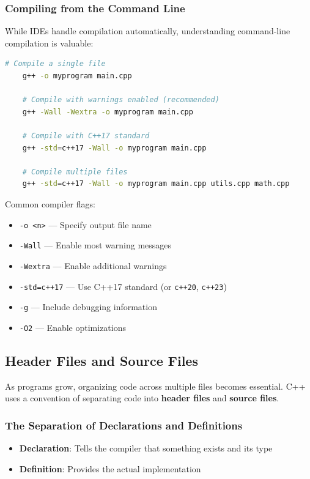 \subsubsection{Compiling from the Command Line}

While IDEs handle compilation automatically, understanding command-line compilation is valuable:

\begin{lstlisting}[language=bash,numbers=none]
	# Compile a single file
	g++ -o myprogram main.cpp
	
	# Compile with warnings enabled (recommended)
	g++ -Wall -Wextra -o myprogram main.cpp
	
	# Compile with C++17 standard
	g++ -std=c++17 -Wall -o myprogram main.cpp
	
	# Compile multiple files
	g++ -std=c++17 -Wall -o myprogram main.cpp utils.cpp math.cpp
\end{lstlisting}

Common compiler flags:
\begin{itemize}
	\item \texttt{-o <n>} — Specify output file name
	\item \texttt{-Wall} — Enable most warning messages
	\item \texttt{-Wextra} — Enable additional warnings
	\item \texttt{-std=c++17} — Use C++17 standard (or \texttt{c++20}, \texttt{c++23})
	\item \texttt{-g} — Include debugging information
	\item \texttt{-O2} — Enable optimizations
\end{itemize}

\subsection{Header Files and Source Files}

As programs grow, organizing code across multiple files becomes essential. C++ uses a convention of separating code into \textbf{header files} and \textbf{source files}.

\subsubsection{The Separation of Declarations and Definitions}

\begin{itemize}
	\item \textbf{Declaration}: Tells the compiler that something exists and its type
	\item \textbf{Definition}: Provides the actual implementation
\end{itemize}

